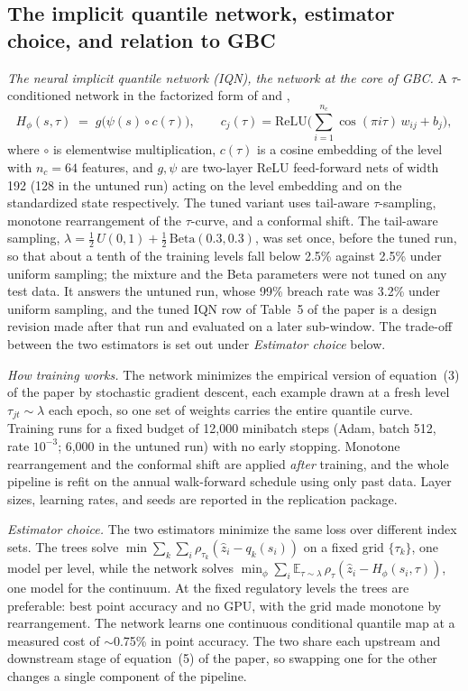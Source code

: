 \documentclass[11pt]{article}
\begin{document}
\subsection*{The implicit quantile network, estimator choice, and relation to GBC}
\emph{The neural implicit quantile network (IQN), the network at the core of GBC.} A
$\tau$-conditioned network
in the factorized form of \citet{dabney2018iqn} and
\citet{polson2023gbc},
\begin{equation}
H_\phi(s,\tau) \;=\; g\big(\psi(s)\circ c(\tau)\big),
\qquad
c_j(\tau) = \mathrm{ReLU}\Big(\textstyle\sum_{i=1}^{n_c}
\cos(\pi i \tau)\, w_{ij} + b_j\Big),
\label{eq:oaiqn}
\end{equation}
where $\circ$ is elementwise multiplication, $c(\tau)$ is a cosine embedding of the level with $n_c=64$ features, and $g,\psi$ are two-layer ReLU feed-forward nets of width 192 (128 in the untuned run) acting on the level embedding and on the standardized state respectively. The tuned variant uses tail-aware $\tau$-sampling, monotone rearrangement of the $\tau$-curve, and a conformal shift. The tail-aware sampling, $\lambda = \tfrac12\,U(0,1) + \tfrac12\,\mathrm{Beta}(0.3,0.3)$, was set once, before the tuned run, so that about a tenth of the training levels fall below 2.5\% against 2.5\% under uniform sampling; the mixture and the Beta parameters were not tuned on any test data. It answers the untuned run, whose 99\% breach rate was 3.2\% under uniform sampling, and the tuned IQN row of Table~5 of the paper is a design revision made after that run and evaluated on a later sub-window. The trade-off between the two estimators is set out under \emph{Estimator choice} below.

\emph{How training works.} The network minimizes the empirical version
of equation~(3) of the paper by stochastic gradient descent, each example
drawn at a fresh level $\tau_{jt}\sim\lambda$ each epoch, so one set of
weights carries the entire quantile curve. Training runs for a fixed budget of 12{,}000 minibatch steps (Adam, batch 512, rate $10^{-3}$; 6{,}000 in the untuned run) with no early stopping. Monotone rearrangement and the conformal shift
are applied \emph{after} training, and the whole pipeline is refit on
the annual walk-forward schedule using only past data. Layer sizes,
learning rates, and seeds are reported in the replication package.

\noindent\emph{Estimator choice.} The two estimators minimize the same loss over different index sets. The trees solve $\min \sum_{k}\sum_{i}\rho_{\tau_k}(\widehat{z}_i - q_k(s_i))$ on a fixed grid $\{\tau_k\}$, one model per level, while the network solves $\min_\phi \sum_i \mathbb{E}_{\tau\sim\lambda}\, \rho_\tau(\widehat{z}_i - H_\phi(s_i,\tau))$, one model for the continuum. At the fixed regulatory levels the trees are preferable: best point accuracy and no GPU, with the grid made monotone by rearrangement. The network learns one continuous conditional quantile map at a measured cost of $\sim$0.75\% in point accuracy. The two share each upstream and downstream stage of equation~(5) of the paper, so swapping one for the other changes a single component of the pipeline.
\end{document}
